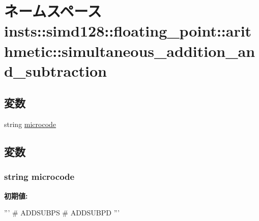 \hypertarget{namespaceinsts_1_1simd128_1_1floating__point_1_1arithmetic_1_1simultaneous__addition__and__subtraction}{
\section{ネームスペース insts::simd128::floating\_\-point::arithmetic::simultaneous\_\-addition\_\-and\_\-subtraction}
\label{namespaceinsts_1_1simd128_1_1floating__point_1_1arithmetic_1_1simultaneous__addition__and__subtraction}
}
\subsection*{変数}
\begin{DoxyCompactItemize}
\item 
string \hyperlink{namespaceinsts_1_1simd128_1_1floating__point_1_1arithmetic_1_1simultaneous__addition__and__subtraction_a770f11a173e99389a8802f0107ed8f52}{microcode}
\end{DoxyCompactItemize}


\subsection{変数}
\hypertarget{namespaceinsts_1_1simd128_1_1floating__point_1_1arithmetic_1_1simultaneous__addition__and__subtraction_a770f11a173e99389a8802f0107ed8f52}{
\subsubsection[{microcode}]{\setlength{\rightskip}{0pt plus 5cm}string {\bf microcode}}}
\label{namespaceinsts_1_1simd128_1_1floating__point_1_1arithmetic_1_1simultaneous__addition__and__subtraction_a770f11a173e99389a8802f0107ed8f52}
{\bfseries 初期値:}
\begin{DoxyCode}
'''
# ADDSUBPS
# ADDSUBPD
'''
\end{DoxyCode}
